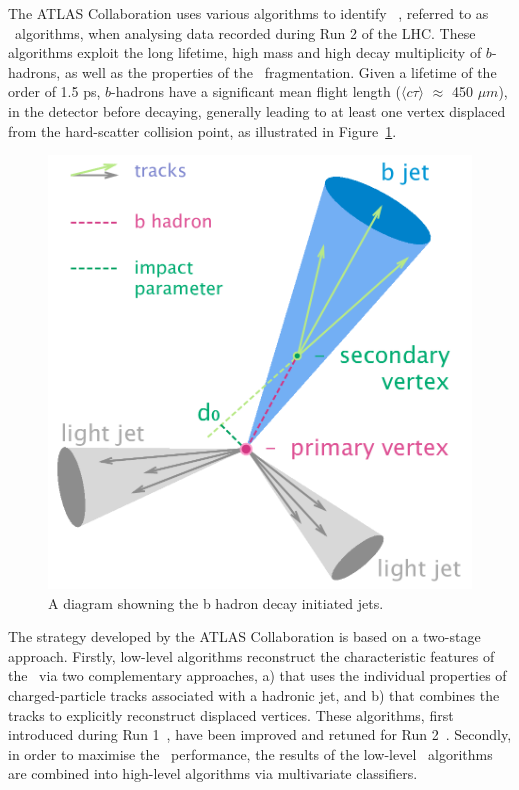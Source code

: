 The ATLAS Collaboration uses various algorithms to identify 
\bjets~\cite{PERF-2012-04}, referred to as \btagging\ algorithms, 
when analysing data recorded during Run 2 of the LHC. These 
algorithms exploit the long lifetime, high mass and high decay 
multiplicity of $b$-hadrons, as well as the properties of the \bquark\  
fragmentation. Given a lifetime of the order of 1.5 ps, $b$-hadrons have a 
significant mean flight length ($\langle c\tau \rangle$ $\approx$ 450 $\mu m$), 
in the detector before decaying, generally leading to at least one vertex 
displaced from the hard-scatter collision point, as illustrated in Figure~\ref{fig:b-jet-decay}.

\begin{figure}[bth]
	\begin{centering}	
	\includegraphics[width=.6\textwidth]{FTAG_plots/B-tagging_diagram.png}
	\caption{A diagram showning the b hadron decay initiated jets. }
	\label{fig:b-jet-decay}
	\end{centering}
\end{figure}


The strategy developed by the ATLAS Collaboration is based on a two-stage approach. 
Firstly, low-level algorithms reconstruct the characteristic features of 
the \bjets\ via two complementary approaches, a) that uses the 
individual properties of charged-particle tracks
associated with a hadronic jet, and b) that 
combines the tracks to explicitly reconstruct displaced vertices. 
These algorithms, first introduced during Run 1~\cite{PERF-2012-04}, 
have been improved and retuned for Run 2~\cite{FTAG-2018-01}. 
Secondly, in order to 
maximise the \btagging\ performance, the results of the low-level 
\btagging\ algorithms are combined into high-level algorithms 
via multivariate classifiers. 


